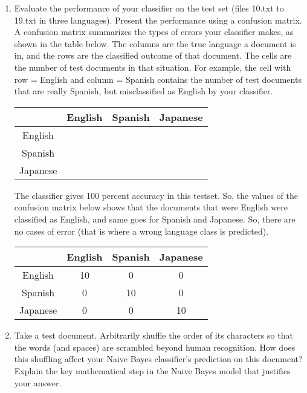 \documentclass[a4paper]{article}
\theoremstyle{definition}
\newenvironment{soln}{
    \leavevmode\color{blue}\ignorespaces
}{}
\begin{document}
\begin{enumerate}
\item
Evaluate the performance of your classifier on the test set (files 10.txt to 19.txt in three languages).
Present the performance using a confusion matrix. A confusion matrix summarizes the types of errors your classifier makes, as shown in the table below.   The columns are the true language a document is in, and the rows are the classified outcome of that document.  The cells are the number of test documents in that situation.  For example, the cell with row = English and column = Spanish contains the number of test documents that are really Spanish, but misclassified as English by your classifier.

\begin{center}
\begin{tabular}{c|ccc}
& English & Spanish & Japanese \\
\hline
English&&&\\
Spanish&&&\\
Japanese&&&
\end{tabular}
\end{center}

\begin{soln}

The classifier gives 100 percent accuracy in this testset. So, the values of the confusion matrix below shows that the documents that were English were classified as English, and same goes for Spanish and Japanese. So, there are no cases of error (that is where a wrong language class is predicted).

	\begin{center}
	\begin{tabular}{c|ccc}
	& English & Spanish & Japanese \\
	\hline
	English&10&0&0\\
	Spanish&0&10&0\\
	Japanese&0&0&10
\end{tabular}
\end{center}
	
\end{soln}

\item Take a test document.   Arbitrarily shuffle the order of its characters so that the words (and spaces) are scrambled beyond human recognition.  How does this shuffling affect your Naive Bayes classifier's prediction on this document?  Explain the key mathematical step in the Naive Bayes model that justifies your answer.
\begin{soln}


\end{soln}
\end{enumerate}
\end{document}
